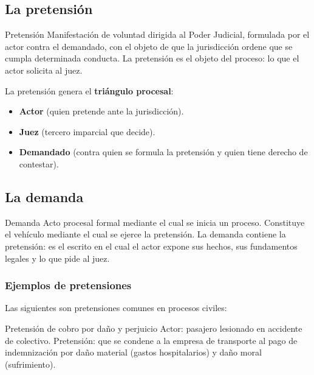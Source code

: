 \documentclass[12pt,oneside]{book}
\begin{document}
\subsection{La pretensión}

\begin{definition}{Pretensión}
Manifestación de voluntad dirigida al Poder Judicial, formulada por el actor contra el demandado, con el objeto de que la jurisdicción ordene que se cumpla determinada conducta. La pretensión es el objeto del proceso: lo que el actor solicita al juez.
\end{definition}

La pretensión genera el \textbf{triángulo procesal}:

\begin{itemize}
    \item \textbf{Actor} (quien pretende ante la jurisdicción).
    \item \textbf{Juez} (tercero imparcial que decide).
    \item \textbf{Demandado} (contra quien se formula la pretensión y quien tiene derecho de contestar).
\end{itemize}

\subsection{La demanda}

\begin{definition}{Demanda}
Acto procesal formal mediante el cual se inicia un proceso. Constituye el vehículo mediante el cual se ejerce la pretensión. La demanda contiene la pretensión: es el escrito en el cual el actor expone sus hechos, sus fundamentos legales y lo que pide al juez.
\end{definition}

\subsubsection{Ejemplos de pretensiones}

Las siguientes son pretensiones comunes en procesos civiles:

\begin{example}{Pretensión de cobro por daño y perjuicio}
Actor: pasajero lesionado en accidente de colectivo. Pretensión: que se condene a la empresa de transporte al pago de indemnización por daño material (gastos hospitalarios) y daño moral (sufrimiento).
\end{example}
\end{document}

